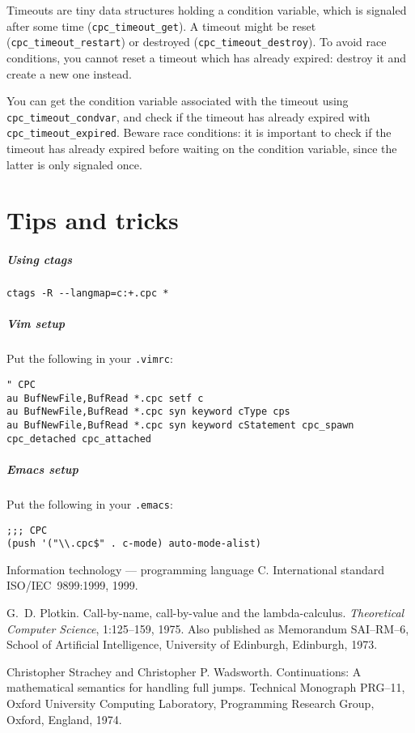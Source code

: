 \documentclass[a4paper]{report}
\begin{document}
Timeouts are tiny data structures holding a condition variable, which is
signaled after some time ({\tt cpc\_timeout\_get}).  A timeout might be reset
({\tt cpc\_timeout\_restart}) or destroyed ({\tt cpc\_timeout\_destroy}).  To
avoid race conditions, you cannot reset a timeout which has already expired:
destroy it and create a new one instead.

You can get the condition variable associated with the timeout using {\tt
cpc\_timeout\_condvar}, and check if the timeout has already expired with {\tt
cpc\_timeout\_expired}.  Beware race conditions: it is important to check if
the timeout has already expired before waiting on the condition variable, since
the latter is only signaled once.

\chapter{Tips and tricks}

\paragraph{Using ctags}
\begin{verbatim}
ctags -R --langmap=c:+.cpc *
\end{verbatim}

\paragraph{Vim setup} Put the following in your {\tt .vimrc}:
\begin{verbatim}
" CPC
au BufNewFile,BufRead *.cpc setf c
au BufNewFile,BufRead *.cpc syn keyword cType cps
au BufNewFile,BufRead *.cpc syn keyword cStatement cpc_spawn cpc_detached cpc_attached
\end{verbatim}

\paragraph{Emacs setup} Put the following in your {\tt .emacs}:
\begin{verbatim}
;;; CPC
(push '("\\.cpc$" . c-mode) auto-mode-alist)
\end{verbatim}

\begin{thebibliography}{MTHM90}

Information technology --- programming language {C}.
International standard ISO/IEC~9899:1999, 1999.

G.~D. Plotkin.
Call-by-name, call-by-value and the lambda-calculus.
{\em Theoretical Computer Science}, 1:125--159, 1975.
Also published as Memorandum SAI--RM--6, School of Artificial
  Intelligence, University of Edinburgh, Edinburgh, 1973.

Christopher Strachey and Christopher P. Wadsworth.
Continuations: A mathematical semantics for handling full jumps.
Technical Monograph PRG--11, Oxford University Computing
Laboratory, Programming Research Group, Oxford, England, 1974.

\end{thebibliography}
\end{document}
